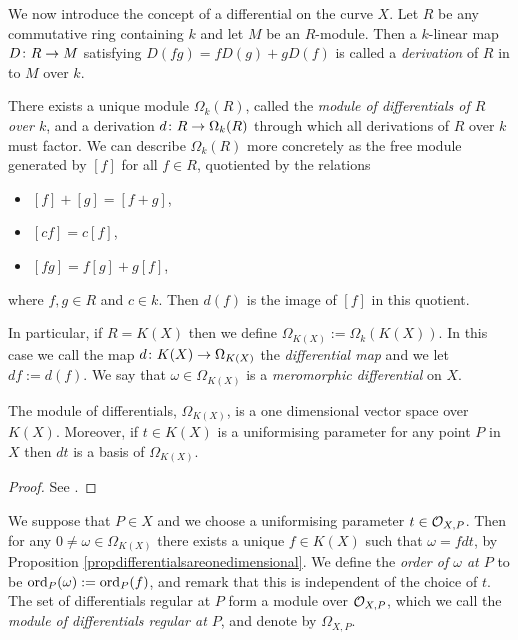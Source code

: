 We now introduce the concept of a differential on the curve $X$.
Let $R$ be any commutative ring containing $k$ and let $M$ be an $R$-module.
Then a $k$-linear map $D \colon R \rightarrow M$ satisfying $D(fg) = fD(g) + gD(f)$ is called a \emph{derivation} of $R$ in to $M$ over $k$.

There exists a unique module $\Omega_k(R)$, called the \emph{module of differentials of $R$ over $k$}, and a derivation $d \colon R \rightarrow \Omega_k(R)$ through which all derivations of $R$ over $k$ must factor.
We can describe $\Omega_k(R)$ more concretely as the free module generated by $[f]$ for all $f \in R$, quotiented by the relations
    \begin{itemize}
    \item $[f]+[g] = [f+g]$,
    \item $[cf] = c[f]$,
    \item $[fg] = f[g] + g[f]$,
    \end{itemize}
where $f, g \in R$ and $c \in k$.
Then $d(f)$ is the image of $[f]$ in this quotient.

In particular, if $R = K(X)$ then we define $\Omega_{K(X)} := \Omega_k(K(X))$.
In this case we call the map $d \colon K(X) \rightarrow \Omega_{K(X)}$ the \emph{differential map} and we let $df := d(f)$.
We say that $\omega \in \Omega_{K(X)}$ is a \emph{meromorphic differential} on $X$.

    \begin{prop}\label{propdifferentialsareonedimensional}
    The module of differentials, $\Omega_{K(X)}$, is a one dimensional vector space over $K(X)$.
    Moreover, if $t \in K(X)$ is a uniformising parameter for any point $P$ in $X$ then $dt$ is a basis of $\Omega_{K(X)}$.
    \end{prop}
    \begin{proof}
    See \cite[Prop. 1.5.9]{stichtenoth}.
    \end{proof}

We suppose that $P \in X$ and we choose a uniformising parameter $t \in {\cal O}_{X,P}$.
Then for any $ 0 \neq \omega \in \Omega_{K(X)}$ there exists a unique $f \in K(X)$ such that $\omega = fdt$, by Proposition \ref{propdifferentialsareonedimensional}.
We define the \emph{order of $\omega$ at $P$} to be $\operatorname{ord}_P(\omega) := \operatorname{ord}_P(f)$, and remark that this is independent of the choice of $t$.
The set of differentials regular at $P$ form a module over ${\cal O}_{X,P}$, which we call the \emph{module of differentials regular at $P$}, and denote by $\Omega_{X,P}$.

